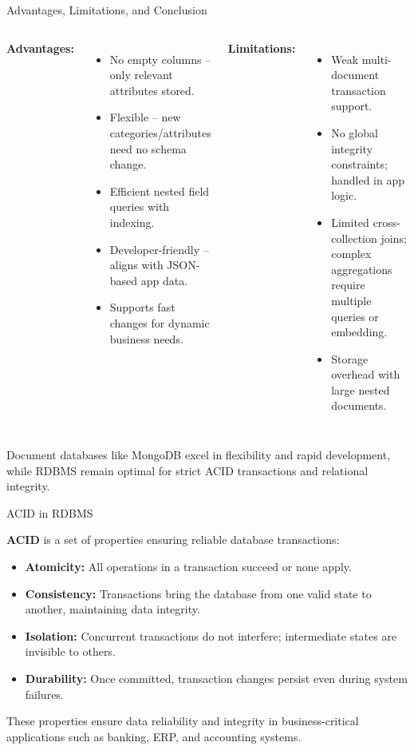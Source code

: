 \documentclass[aspectratio=169, table]{beamer}
\begin{document}
\begin{frame}{Advantages, Limitations, and Conclusion}
	\vspace{20pt}
	
	\begin{columns}[T]
		
		\textbf{Advantages:}
		\begin{itemize}
			\item No empty columns – only relevant attributes stored.
			\item Flexible – new categories/attributes need no schema change.
			\item Efficient nested field queries with indexing.
			\item Developer-friendly – aligns with JSON-based app data.
			\item Supports fast changes for dynamic business needs.
		\end{itemize}
		
		\textbf{Limitations:}
		\begin{itemize}
			\item Weak multi-document transaction support.
			\item No global integrity constraints; handled in app logic.
			\item Limited cross-collection joins; complex aggregations require multiple queries or embedding.
			\item Storage overhead with large nested documents.
		\end{itemize}
	\end{columns}
\vspace{10pt}
Document databases like MongoDB excel in flexibility and rapid development, while RDBMS remain optimal for strict ACID transactions and relational integrity.
\end{frame}

\begin{frame}{ACID in RDBMS}
	\vspace{20pt}
	
	\textbf{ACID} is a set of properties ensuring reliable database transactions:
	
	\begin{itemize}
		\item \textbf{Atomicity:} All operations in a transaction succeed or none apply.
		\item \textbf{Consistency:} Transactions bring the database from one valid state to another, maintaining data integrity.
		\item \textbf{Isolation:} Concurrent transactions do not interfere; intermediate states are invisible to others.
		\item \textbf{Durability:} Once committed, transaction changes persist even during system failures.
	\end{itemize}
	
	These properties ensure data reliability and integrity in business-critical applications such as banking, ERP, and accounting systems.
	
\end{frame}
\end{document}
